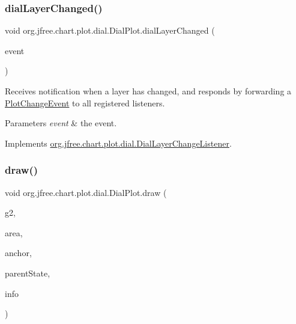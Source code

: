 \subsubsection{\texorpdfstring{dial\+Layer\+Changed()}{dialLayerChanged()}}
{\footnotesize\ttfamily void org.\+jfree.\+chart.\+plot.\+dial.\+Dial\+Plot.\+dial\+Layer\+Changed (\begin{DoxyParamCaption}\item[{\mbox{\hyperlink{classorg_1_1jfree_1_1chart_1_1plot_1_1dial_1_1_dial_layer_change_event}{Dial\+Layer\+Change\+Event}}}]{event }\end{DoxyParamCaption})}

Receives notification when a layer has changed, and responds by forwarding a \mbox{\hyperlink{}{Plot\+Change\+Event}} to all registered listeners.


\begin{DoxyParams}{Parameters}
{\em event} & the event. \\
\hline
\end{DoxyParams}


Implements \mbox{\hyperlink{interfaceorg_1_1jfree_1_1chart_1_1plot_1_1dial_1_1_dial_layer_change_listener_ad97d40ca8aa072d975cd285da2b07c75}{org.\+jfree.\+chart.\+plot.\+dial.\+Dial\+Layer\+Change\+Listener}}.

\mbox{\label{classorg_1_1jfree_1_1chart_1_1plot_1_1dial_1_1_dial_plot_a66c9537df3df2147aa46cf39b1b8f65f}} 
\subsubsection{\texorpdfstring{draw()}{draw()}}
{\footnotesize\ttfamily void org.\+jfree.\+chart.\+plot.\+dial.\+Dial\+Plot.\+draw (\begin{DoxyParamCaption}\item[{Graphics2D}]{g2,  }\item[{Rectangle2D}]{area,  }\item[{Point2D}]{anchor,  }\item[{\mbox{\hyperlink{classorg_1_1jfree_1_1chart_1_1plot_1_1_plot_state}{Plot\+State}}}]{parent\+State,  }\item[{\mbox{\hyperlink{classorg_1_1jfree_1_1chart_1_1plot_1_1_plot_rendering_info}{Plot\+Rendering\+Info}}}]{info }\end{DoxyParamCaption})}

